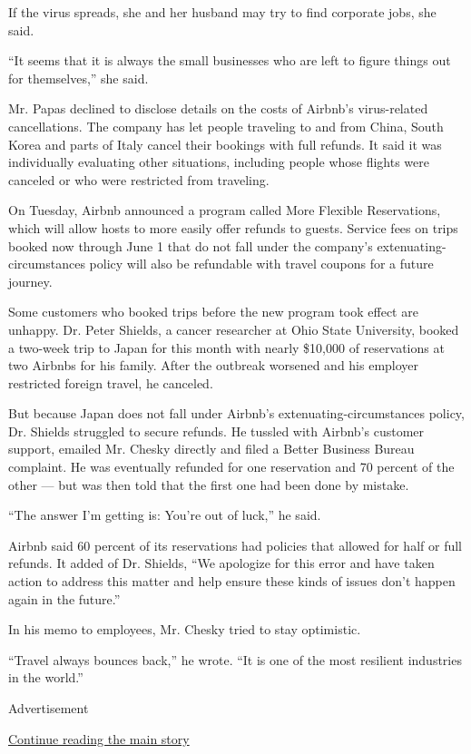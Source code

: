 If the virus spreads, she and her husband may try to find corporate
jobs, she said.

``It seems that it is always the small businesses who are left to figure
things out for themselves,'' she said.

Mr. Papas declined to disclose details on the costs of Airbnb's
virus-related cancellations. The company has let people traveling to and
from China, South Korea and parts of Italy cancel their bookings with
full refunds. It said it was individually evaluating other situations,
including people whose flights were canceled or who were restricted from
traveling.

On Tuesday, Airbnb announced a program called More Flexible
Reservations, which will allow hosts to more easily offer refunds to
guests. Service fees on trips booked now through June 1 that do not fall
under the company's extenuating-circumstances policy will also be
refundable with travel coupons for a future journey.

Some customers who booked trips before the new program took effect are
unhappy. Dr. Peter Shields, a cancer researcher at Ohio State
University, booked a two-week trip to Japan for this month with nearly
\$10,000 of reservations at two Airbnbs for his family. After the
outbreak worsened and his employer restricted foreign travel, he
canceled.

But because Japan does not fall under Airbnb's extenuating-circumstances
policy, Dr. Shields struggled to secure refunds. He tussled with
Airbnb's customer support, emailed Mr. Chesky directly and filed a
Better Business Bureau complaint. He was eventually refunded for one
reservation and 70 percent of the other --- but was then told that the
first one had been done by mistake.

``The answer I'm getting is: You're out of luck,'' he said.

Airbnb said 60 percent of its reservations had policies that allowed for
half or full refunds. It added of Dr. Shields, ``We apologize for this
error and have taken action to address this matter and help ensure these
kinds of issues don't happen again in the future.''

In his memo to employees, Mr. Chesky tried to stay optimistic.

``Travel always bounces back,'' he wrote. ``It is one of the most
resilient industries in the world.''

Advertisement

\protect\hyperlink{after-bottom}{Continue reading the main story}

